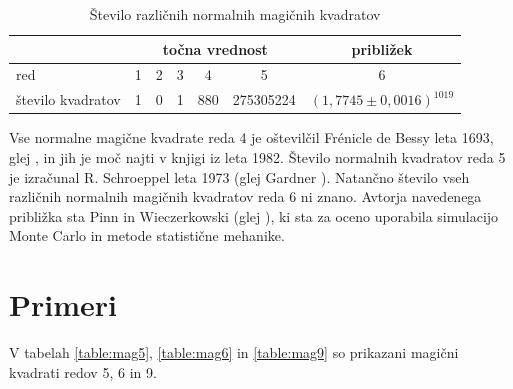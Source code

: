 \documentclass[a4paper,12pt]{article}
\theoremstyle{definition}
\theoremstyle{plain}
\begin{document}
\begin{table}[!ht]
   \centering
   \caption{Število različnih normalnih magičnih kvadratov}
   \begin{tabular}{lcccccc}\toprule
      & \multicolumn{5}{c}{točna vrednost} & približek\\\midrule
      red & 1 & 2 & 3 & 4 & 5 & 6\\
      število kvadratov & 1 & 0 & 1 & 880 & 275305224 & \( (1,7745 \pm 0,0016)^{1019} \)\\
   \bottomrule
   \end{tabular}
   \label{table:stevila}
\end{table}

Vse normalne magične kvadrate reda 4 je oštevilčil Frénicle de Bessy
leta 1693, glej \cite{bessy}, in jih je moč najti v knjigi \cite{berlekamp}
iz leta 1982. Število normalnih kvadratov reda 5 je izračunal
R. Schroeppel leta 1973 (glej Gardner \cite{gardner}).
Natančno število vseh različnih normalnih magičnih kvadratov reda 6 ni znano.
Avtorja navedenega približka sta Pinn in Wieczerkowski (glej \cite{pinn}), ki
sta za oceno uporabila simulacijo Monte Carlo in metode statistične mehanike.
\section{Primeri}

V tabelah \ref{table:mag5}, \ref{table:mag6} in \ref{table:mag9} so prikazani
magični kvadrati redov 5, 6 in 9.
\end{document}
